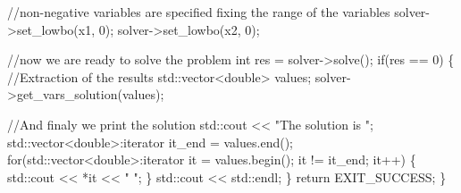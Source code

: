 \begin{DoxyCode}
  \textcolor{comment}{//non-negative variables are specified fixing the range of the variables}
  solver->set\_lowbo(x1, 0);
  solver->set\_lowbo(x2, 0);

  \textcolor{comment}{//now we are ready to solve the problem}
  \textcolor{keywordtype}{int} res = solver->solve();
  \textcolor{keywordflow}{if}(res == 0)
  \{
    \textcolor{comment}{//Extraction of the results}
    std::vector<double> values;
    solver->get\_vars\_solution(values);

    \textcolor{comment}{//And finaly we print the solution}
    std::cout << \textcolor{stringliteral}{"The solution is "};
    std::vector<double>:iterator it\_end = values.end();
    \textcolor{keywordflow}{for}(std::vector<double>:iterator it = values.begin(); it != it\_end; it++)
    \{
      std::cout << *it << \textcolor{stringliteral}{" "};
    \}
    std::cout << std::endl;
  \}
  \textcolor{keywordflow}{return} EXIT\_SUCCESS;
\}
\end{DoxyCode}
 